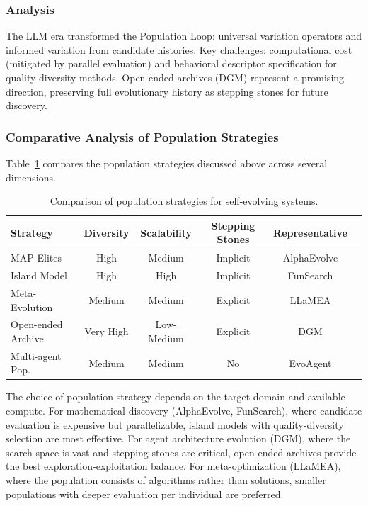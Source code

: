 \subsubsection{Analysis}

The LLM era transformed the Population Loop: universal variation operators and informed variation from candidate histories. Key challenges: computational cost (mitigated by parallel evaluation) and behavioral descriptor specification for quality-diversity methods. Open-ended archives (DGM) represent a promising direction, preserving full evolutionary history as stepping stones for future discovery.

\subsubsection{Comparative Analysis of Population Strategies}

Table~\ref{tab:population_comparison} compares the population strategies discussed above across several dimensions.

\begin{table}[t]
\centering
\small
\caption{Comparison of population strategies for self-evolving systems.}
\label{tab:population_comparison}
\begin{tabular}{@{}lccccc@{}}
\toprule
\textbf{Strategy} & \textbf{Diversity} & \textbf{Scalability} & \textbf{Stepping Stones} & \textbf{Representative} \\
\midrule
MAP-Elites & High & Medium & Implicit & AlphaEvolve \\
Island Model & High & High & Implicit & FunSearch \\
Meta-Evolution & Medium & Medium & Explicit & LLaMEA \\
Open-ended Archive & Very High & Low-Medium & Explicit & DGM \\
Multi-agent Pop. & Medium & Medium & No & EvoAgent \\
\bottomrule
\end{tabular}
\end{table}

The choice of population strategy depends on the target domain and available compute. For mathematical discovery (AlphaEvolve, FunSearch), where candidate evaluation is expensive but parallelizable, island models with quality-diversity selection are most effective. For agent architecture evolution (DGM), where the search space is vast and stepping stones are critical, open-ended archives provide the best exploration-exploitation balance. For meta-optimization (LLaMEA), where the population consists of algorithms rather than solutions, smaller populations with deeper evaluation per individual are preferred.

